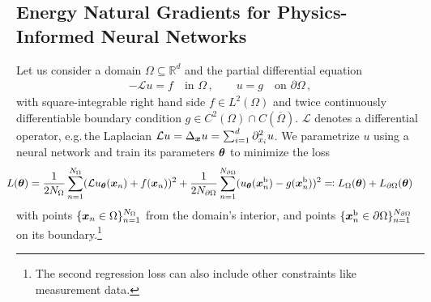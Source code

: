 \subsection{Energy Natural Gradients for Physics-Informed Neural Networks}
Let us consider a domain $\Omega\subseteq\mathbb R^d$ and the partial differential equation
\begin{align*}
  -\mathcal{L} u = f \quad \text{in }\Omega\,,
                   \qquad
  u = g \quad \text{on }\partial\Omega\,,
\end{align*}
with square-integrable right hand side $f\in L^2(\Omega)$ and twice continuously differentiable boundary condition $g\in C^2(\Omega)\cap C(\overline{\Omega})$.
$\mathcal{L}$ denotes a differential operator, e.g.\,the Laplacian $\mathcal{L} u = \Delta_{{\bm{x}}} u = \sum_{i=1}^d \partial_{{x}_i}^2 u$.
We parametrize $u$ using a neural network and train its parameters ${\bm{\theta}}$ to minimize the loss
\begin{align}\label{eq:pinn-loss}
  \!\!\!\!\!\!
  L({\bm{\theta}})
  &=
    \frac{1}{2N_\Omega} \sum_{n=1}^{N_\Omega} (\mathcal{L} u_{\bm{\theta}}({\bm{x}}_n) + f({\bm{x}}_n))^2
    +
    \frac{1}{2N_{\partial\Omega}}\sum_{n=1}^{N_{\partial\Omega}} ( u_{\bm{\theta}}({\bm{x}}^\text{b}_n) - g({\bm{x}}^\text{b}_n))^2
    \eqqcolon
    L_\Omega({\bm{\theta}}) + L_{\partial\Omega}({\bm{\theta}})
\end{align}
with points $\{{\bm{x}}_n \in \Omega \}_{n=1}^{N_\Omega}$ from the domain's interior, and points $\{{\bm{x}}^\text{b}_n \in \partial\Omega \}_{n=1}^{N_{\partial\Omega}}$ on its boundary.\footnote{The second regression loss can also include other constraints like measurement data.}

